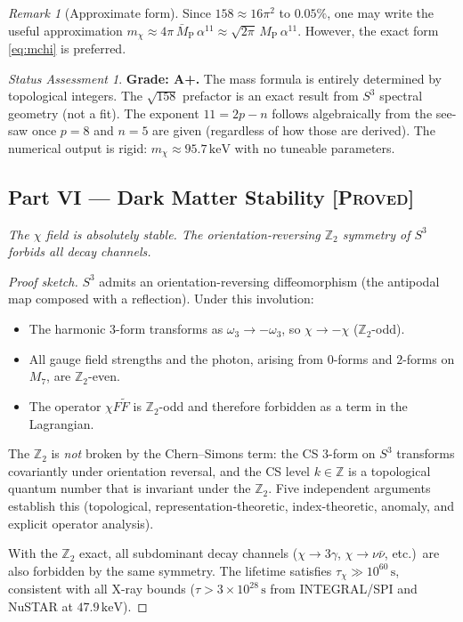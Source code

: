 \documentclass[11pt]{article}
\theoremstyle{definition}
\theoremstyle{remark}
\newtheorem*{remark}{Remark}
\newtheorem*{status}{Status Assessment}
\newcommand{\MP}{M_{\mathrm{P}}}
\newcommand{\MPbar}{\bar{M}_{\mathrm{P}}}
\newcommand{\keV}{\,\mathrm{keV}}
\begin{document}
\begin{remark}[Approximate form]
Since $158 \approx 16\pi^2$ to $0.05\%$, one may write the useful
approximation $m_\chi \approx 4\pi\,\MPbar\,\alpha^{11}
\approx \sqrt{2\pi}\,\MP\,\alpha^{11}$.  However, the exact form
\eqref{eq:mchi} is preferred.
\end{remark}

\begin{status}
\textbf{Grade: A+.}  The mass formula is entirely determined by
topological integers.  The $\sqrt{158}$ prefactor is an exact result
from $S^3$ spectral geometry (not a fit).  The exponent $11 = 2p - n$
follows algebraically from the see-saw once $p = 8$ and $n = 5$
are given (regardless of how those are derived).  The numerical
output is rigid: $m_\chi \approx 95.7\keV$ with no tuneable
parameters.
\end{status}


\subsection*{Part VI --- Dark Matter Stability%
\hfill\normalfont\textsc{[Proved]}}

\textit{The $\chi$ field is absolutely stable.  The orientation-reversing
$\mathbb{Z}_2$ symmetry of $S^3$ forbids all decay channels.}

\begin{proof}[Proof sketch]
$S^3$ admits an orientation-reversing diffeomorphism (the antipodal
map composed with a reflection).  Under this involution:
\begin{itemize}
\item The harmonic $3$-form transforms as $\omega_3 \to -\omega_3$,
  so $\chi \to -\chi$ ($\mathbb{Z}_2$-odd).
\item All gauge field strengths and the photon, arising from $0$-forms
  and $2$-forms on $M_7$, are $\mathbb{Z}_2$-even.
\item The operator $\chi F \tilde{F}$ is $\mathbb{Z}_2$-odd and
  therefore forbidden as a term in the Lagrangian.
\end{itemize}
The $\mathbb{Z}_2$ is \emph{not} broken by the Chern--Simons term:
the CS $3$-form on $S^3$ transforms covariantly under orientation
reversal, and the CS level $k \in \mathbb{Z}$ is a topological
quantum number that is invariant under the $\mathbb{Z}_2$.  Five
independent arguments establish this (topological, representation-theoretic,
index-theoretic, anomaly, and explicit operator analysis).

With the $\mathbb{Z}_2$ exact, all subdominant decay channels
($\chi \to 3\gamma$, $\chi \to \nu\bar\nu$, etc.)\ are also
forbidden by the same symmetry.  The lifetime satisfies
$\tau_\chi \gg 10^{60}\,\mathrm{s}$, consistent with all X-ray
bounds ($\tau > 3 \times 10^{28}\,\mathrm{s}$ from INTEGRAL/SPI
and NuSTAR at $47.9\keV$).
\end{proof}
\end{document}
